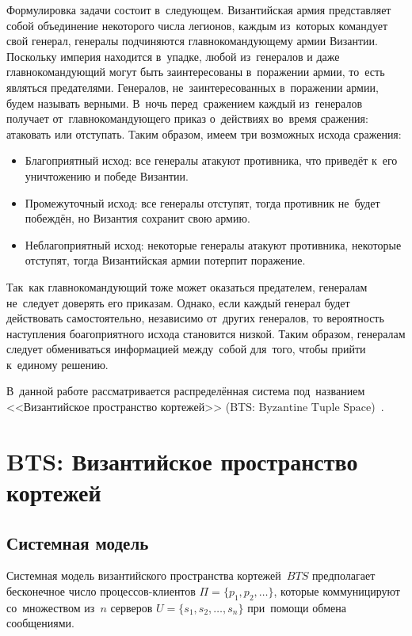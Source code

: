 Формулировка задачи состоит в~следующем. Византийская армия представляет собой объединение некоторого числа легионов, каждым из~которых командует свой генерал, генералы подчиняются главнокомандующему армии Византии. Поскольку империя находится в~упадке, любой из~генералов и даже главнокомандующий могут быть заинтересованы в~поражении армии, то~есть являться предателями. Генералов, не~заинтересованных в~поражении армии, будем называть верными. В~ночь перед~сражением каждый из~генералов получает от~главнокомандующего приказ о~действиях во~время сражения: атаковать или отступать. Таким образом, имеем три возможных исхода сражения:
\begin{itemize}
	\item Благоприятный исход: все генералы атакуют противника, что приведёт к~его уничтожению и победе Византии.
	\item Промежуточный исход: все генералы отступят, тогда противник не~будет побеждён, но Византия сохранит свою армию.
	\item Неблагоприятный исход: некоторые генералы атакуют противника, некоторые отступят, тогда Византийская армии потерпит поражение.
\end{itemize}

Так~как главнокомандующий тоже может оказаться предателем, генералам не~следует доверять его приказам. Однако, если каждый генерал будет действовать самостоятельно, независимо от~других генералов, то вероятность наступления боагоприятного исхода становится низкой. Таким образом, генералам следует обмениваться информацией между~собой для~того, чтобы прийти к~единому решению.

В~данной работе рассматривается распределённая система под~названием <<Византийское пространство кортежей>> ($\mbox{BTS: Byzantine Tuple Space}$)~\autocite{bts}.


\section{BTS: Византийское пространство кортежей}\label{sec:2}
\subsection{Системная модель}\label{subsec:1}
Системная модель византийского пространства кортежей~$BTS$ предполагает бесконечное число процессов-клиентов $\Pi = \{p_1, p_2, \dots\}$, которые коммуницируют со~множеством из~$n$ серверов $U = \{s_1, s_2, \dots, s_n\}$ при~помощи обмена сообщениями.

